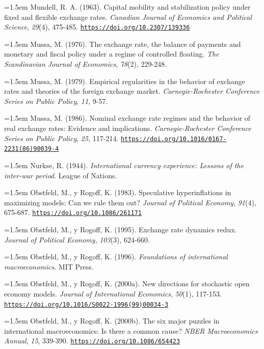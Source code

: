 \documentclass[10pt,a4paper]{article}
\begin{document}
\noindent\hangindent=1.5em Mundell, R. A. (1963). Capital mobility and stabilization policy under fixed and flexible exchange rates. \textit{Canadian Journal of Economics and Political Science}, \textit{29}(4), 475-485. \href{https://doi.org/10.2307/139336}{\nolinkurl{https://doi.org/10.2307/139336}}

\noindent\hangindent=1.5em Mussa, M. (1976). The exchange rate, the balance of payments and monetary and fiscal policy under a regime of controlled floating. \textit{The Scandinavian Journal of Economics}, \textit{78}(2), 229-248.

\noindent\hangindent=1.5em Mussa, M. (1979). Empirical regularities in the behavior of exchange rates and theories of the foreign exchange market. \textit{Carnegie-Rochester Conference Series on Public Policy}, \textit{11}, 9-57.

\noindent\hangindent=1.5em Mussa, M. (1986). Nominal exchange rate regimes and the behavior of real exchange rates: Evidence and implications. \textit{Carnegie-Rochester Conference Series on Public Policy}, \textit{25}, 117-214. \href{https://doi.org/10.1016/0167-2231(86)90039-4}{\nolinkurl{https://doi.org/10.1016/0167-2231(86)90039-4}}

\noindent\hangindent=1.5em Nurkse, R. (1944). \textit{International currency experience: Lessons of the inter-war period}. League of Nations.

\noindent\hangindent=1.5em Obstfeld, M., y Rogoff, K. (1983). Speculative hyperinflations in maximizing models: Can we rule them out? \textit{Journal of Political Economy}, \textit{91}(4), 675-687. \href{https://doi.org/10.1086/261171}{\nolinkurl{https://doi.org/10.1086/261171}}

\noindent\hangindent=1.5em Obstfeld, M., y Rogoff, K. (1995). Exchange rate dynamics redux. \textit{Journal of Political Economy}, \textit{103}(3), 624-660.

\noindent\hangindent=1.5em Obstfeld, M., y Rogoff, K. (1996). \textit{Foundations of international macroeconomics}. MIT Press.

\noindent\hangindent=1.5em Obstfeld, M., y Rogoff, K. (2000a). New directions for stochastic open economy models. \textit{Journal of International Economics}, \textit{50}(1), 117-153. \href{https://doi.org/10.1016/S0022-1996(99)00034-3}{\nolinkurl{https://doi.org/10.1016/S0022-1996(99)00034-3}}

\noindent\hangindent=1.5em Obstfeld, M., y Rogoff, K. (2000b). The six major puzzles in international macroeconomics: Is there a common cause? \textit{NBER Macroeconomics Annual}, \textit{15}, 339-390. \href{https://doi.org/10.1086/654423}{\nolinkurl{https://doi.org/10.1086/654423}}
\end{document}
